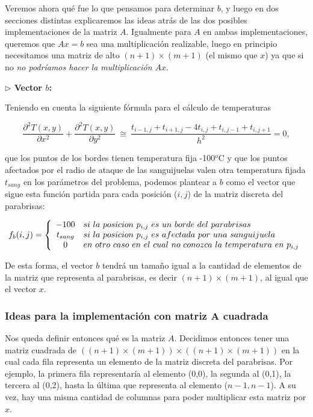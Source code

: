 Veremos ahora qué fue lo que pensamos para determinar $b$, y luego en dos secciones distintas explicaremos las ideas atrás de las dos posibles implementaciones de la matriz $A$. Igualmente para $A$ en ambas implementaciones, queremos que $Ax = b$ sea una multiplicación realizable, luego en principio necesitamos una matriz de alto $(n+1) \times (m+1)$  (el mismo que $x$) ya que si no \textit{no podríamos hacer la multiplicación $Ax$}.

\vspace{\baselineskip}

\vspace{\baselineskip}

{\large \textbf{ $\rhd$ Vector $b$:}}

\vspace{\baselineskip}

 Teniendo en cuenta la siguiente fórmula para el cálculo de temperaturas

\[
\frac{\partial^2T(x,y)}{\partial x^{2}}+\frac{\partial^2 T(x,y)}{\partial y^{2}} \ \cong \ \frac{ t_{i-1,j} + t_{i+1,j} - 4t_{i,j} + t_{i,j-1} + t_{i,j+1}}{h^2} = 0,
\]

que los puntos de los bordes tienen temperatura fija -100${}^o$C y que los puntos afectados por el radio de ataque de las sanguijuelas valen otra temperatura fijada $t_{sang}$ en los parámetros del problema, podemos plantear a $b$ como el vector que sigue esta función partida para cada posición ($i,j$) de la matriz discreta del parabrisas:

$$f_{b}(i,j) = \left\{
\begin{array}{c l}
 -100 & si \ la \ posicion  \ p_{i,j} \ es  \ un \ borde  \ del \ parabrisas\\
 t_{sang} & si \ la \ posicion  \ p_{i,j} \ es \ afectada \ por \ una \ sanguijuela \\
 0 & en \ otro \ caso \ en \ el \ cual \ no \ conozca \ la \ temperatura \ en \ p_{i,j}
\end{array}
\right.
$$

De esta forma, el vector $b$ tendrá un tamaño igual a la cantidad de elementos de la matriz que representa al parabrisas, es decir $(n+1) \times (m+1)$, al igual que el vector $x$.

\subsubsection{Ideas para la implementación con matriz A cuadrada}

Nos queda definir entonces qué es la matriz $A$. Decidimos entonces tener una matriz cuadrada de  $((n+1) \times (m+1)) \times  ((n+1) \times (m+1))$ en la cual cada fila representa un elemento de la matriz discreta del parabrisas. Por ejemplo, la primera fila representaría al elemento (0,0), la segunda al (0,1), la tercera al (0,2), hasta la última que representa al elemento ($n-1,n-1$). A su vez, hay una misma cantidad de columnas para poder multiplicar esta matriz por $x$.

